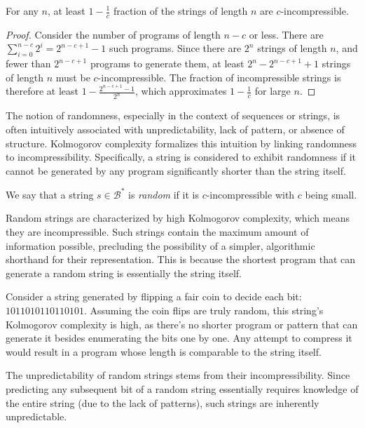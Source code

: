 \begin{proposition}
For any $n$, at least $1 - \frac{1}{c}$ fraction of the strings of length $n$ are $c$-incompressible.
\end{proposition}
\begin{proof}
Consider the number of programs of length $n - c$ or less. There are $\sum_{i=0}^{n-c} 2^i = 2^{n-c+1} - 1$ such programs. Since there are $2^n$ strings of length $n$, and fewer than $2^{n-c+1}$ programs to generate them, at least $2^n - 2^{n-c+1} + 1$ strings of length $n$ must be $c$-incompressible. The fraction of incompressible strings is therefore at least $1 - \frac{2^{n-c+1} - 1}{2^n}$, which approximates $1 - \frac{1}{c}$ for large $n$.
\end{proof}

The notion of randomness, especially in the context of sequences or strings, is often intuitively associated with unpredictability, lack of pattern, or absence of structure. Kolmogorov complexity formalizes this intuition by linking randomness to incompressibility. Specifically, a string is considered to exhibit randomness if it cannot be generated by any program significantly shorter than the string itself.

\begin{definition}
We say that a string $s \in \mathcal{B}^{\ast}$ is \emph{random} if it is $c$-incompressible with $c$ being small.
\end{definition}

Random strings are characterized by high Kolmogorov complexity, which means they are incompressible. Such strings contain the maximum amount of information possible, precluding the possibility of a simpler, algorithmic shorthand for their representation. This is because the shortest program that can generate a random string is essentially the string itself.

\begin{example}
Consider a string generated by flipping a fair coin to decide each bit: $1011010110110101$. Assuming the coin flips are truly random, this string's Kolmogorov complexity is high, as there's no shorter program or pattern that can generate it besides enumerating the bits one by one. Any attempt to compress it would result in a program whose length is comparable to the string itself.
\end{example}

The unpredictability of random strings stems from their incompressibility. Since predicting any subsequent bit of a random string essentially requires knowledge of the entire string (due to the lack of patterns), such strings are inherently unpredictable.

